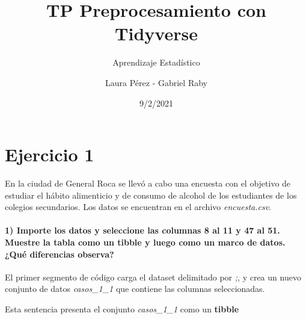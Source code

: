 \documentclass[
]{article}
\title{TP Preprocesamiento con Tidyverse}
\subtitle{Aprendizaje Estadístico}
\author{Laura Pérez - Gabriel Raby}
\date{9/2/2021}
\newenvironment{Shaded}{\begin{snugshade}}{\end{snugshade}}
\newcommand{\CommentTok}[1]{\textcolor[rgb]{0.56,0.35,0.01}{\textit{#1}}}
\newcommand{\DecValTok}[1]{\textcolor[rgb]{0.00,0.00,0.81}{#1}}
\newcommand{\KeywordTok}[1]{\textcolor[rgb]{0.13,0.29,0.53}{\textbf{#1}}}
\newcommand{\NormalTok}[1]{#1}
\newcommand{\OperatorTok}[1]{\textcolor[rgb]{0.81,0.36,0.00}{\textbf{#1}}}
\newcommand{\StringTok}[1]{\textcolor[rgb]{0.31,0.60,0.02}{#1}}
\begin{document}
\maketitle

\hypertarget{ejercicio-1}{%
\section{Ejercicio 1}\label{ejercicio-1}}

En la ciudad de General Roca se llevó a cabo una encuesta con el
objetivo de estudiar el hábito alimenticio y de consumo de alcohol de
los estudiantes de los colegios secundarios. Los datos se encuentran en
el archivo \emph{encuesta.csv}.

\hypertarget{importe-los-datos-y-seleccione-las-columnas-8-al-11-y-47-al-51.-muestre-la-tabla-como-un-tibble-y-luego-como-un-marco-de-datos.-quuxe9-diferencias-observa}{%
\paragraph{1) Importe los datos y seleccione las columnas 8 al 11 y 47
al 51. Muestre la tabla como un tibble y luego como un marco de datos.
¿Qué diferencias
observa?}\label{importe-los-datos-y-seleccione-las-columnas-8-al-11-y-47-al-51.-muestre-la-tabla-como-un-tibble-y-luego-como-un-marco-de-datos.-quuxe9-diferencias-observa}}

El primer segmento de código carga el dataset delimitado por \emph{;}, y
crea un nuevo conjunto de datos \emph{casos\_1\_1} que contiene las
columnas seleccionadas.

\begin{Shaded}
\end{Shaded}

Esta sentencia presenta el conjunto \emph{casos\_1\_1} como un
\textbf{tibble}
\end{document}
